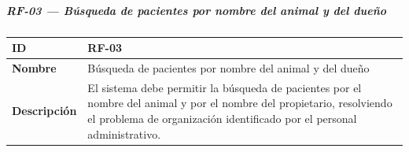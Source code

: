 \documentclass[
]{article}
\newcounter{none} %
\begin{document}
\subparagraph{RF-03 --- Búsqueda de pacientes por nombre del animal y
del
dueño}\label{rf-03-buxfasqueda-de-pacientes-por-nombre-del-animal-y-del-dueuxf1o}

{\def\LTcaptype{none} %
\begin{longtable}[]{@{}
  >{\raggedright\arraybackslash}p{}
  >{\raggedright\arraybackslash}p{}@{}}
\toprule\noalign{}
\begin{minipage}[b]{\linewidth}\raggedright
\textbf{ID}
\end{minipage} & \begin{minipage}[b]{\linewidth}\raggedright
RF-03
\end{minipage} \\
\midrule\noalign{}
\endhead
\bottomrule\noalign{}
\endlastfoot
\textbf{Nombre} & \begin{minipage}[t]{\linewidth}\raggedright
Búsqueda de pacientes por nombre del animal y del dueño
\end{minipage} \\
\textbf{Descripción} & \begin{minipage}[t]{\linewidth}\raggedright
El sistema debe permitir la búsqueda de pacientes por el nombre del
animal y por el nombre del propietario, resolviendo el problema de
organización identificado por el personal administrativo.
\end{minipage} \\
\end{longtable}
}
\end{document}
